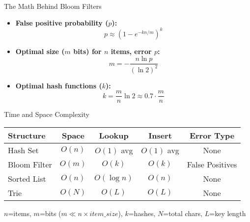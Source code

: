 \begin{frame}{The Math Behind Bloom Filters}
  \begin{itemize}
    \item \textbf{False positive probability ($p$):}
          \begin{equation}
            p \approx \left(1 - e^{-kn/m}\right)^k
          \end{equation}

    \item \textbf{Optimal size ($m$ bits) for $n$ items, error $p$:}
          \begin{equation}
            m = -\frac{n \ln p}{(\ln 2)^2}
          \end{equation}

    \item \textbf{Optimal hash functions ($k$):}
          \begin{equation}
            k = \frac{m}{n} \ln 2 \approx 0.7 \cdot \frac{m}{n}
          \end{equation}
  \end{itemize}
\end{frame}

\begin{frame}{Time and Space Complexity}
  \begin{center}
    \begin{tabular}{l|c|c|c|c}
      \textbf{Structure} & \textbf{Space} & \textbf{Lookup} & \textbf{Insert} & \textbf{Error Type} \\
      \hline
      Hash Set           & $O(n)$         & $O(1)$ avg      & $O(1)$ avg      & None                \\
      Bloom Filter       & $O(m)$         & $O(k)$          & $O(k)$          & False Positives     \\
      Sorted List        & $O(n)$         & $O(\log n)$     & $O(n)$          & None                \\
      Trie               & $O(N)$         & $O(L)$          & $O(L)$          & None                \\
    \end{tabular}
  \end{center}

  $n$=items, $m$=bits ($m \ll n \times item\_size$), $k$=hashes, $N$=total chars, $L$=key length
\end{frame}

